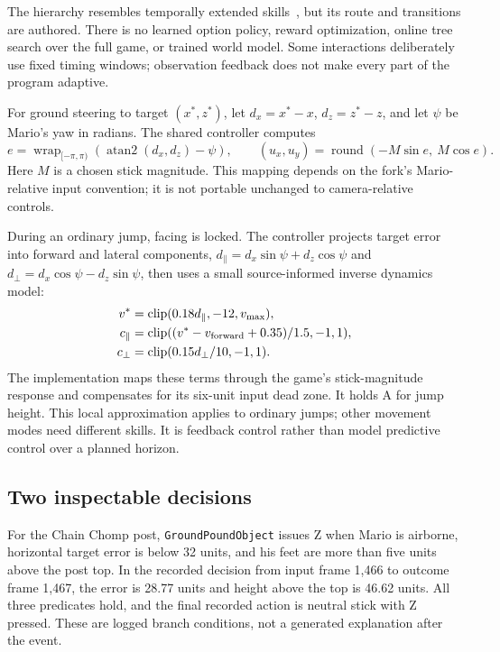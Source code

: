 \documentclass[10pt,letterpaper]{article}
\newcommand{\code}[1]{\texttt{#1}}
\newcommand{\clip}{\operatorname{clip}}
\newcommand{\wrap}{\operatorname{wrap}}
\begin{document}
The hierarchy resembles temporally extended skills~\cite{options}, but its route and transitions are authored. There is no learned option policy, reward optimization, online tree search over the full game, or trained world model. Some interactions deliberately use fixed timing windows; observation feedback does not make every part of the program adaptive.

For ground steering to target $(x^*,z^*)$, let $d_x=x^*-x$, $d_z=z^*-z$, and let $\psi$ be Mario's yaw in radians. The shared controller computes
\begin{equation}
 e=\wrap_{[-\pi,\pi)}(\operatorname{atan2}(d_x,d_z)-\psi),\qquad
 (u_x,u_y)=\operatorname{round}(-M\sin e,\ M\cos e).
\end{equation}
Here $M$ is a chosen stick magnitude. This mapping depends on the fork's Mario-relative input convention; it is not portable unchanged to camera-relative controls.

During an ordinary jump, facing is locked. The controller projects target error into forward and lateral components, $d_\parallel=d_x\sin\psi+d_z\cos\psi$ and $d_\perp=d_x\cos\psi-d_z\sin\psi$, then uses a small source-informed inverse dynamics model:
\begin{align}
 v^*&=\clip(0.18d_\parallel,-12,v_{\max}),\\
 c_\parallel&=\clip((v^*-v_{\rm forward}+0.35)/1.5,-1,1),\\
 c_\perp&=\clip(0.15d_\perp/10,-1,1).
\end{align}
The implementation maps these terms through the game's stick-magnitude response and compensates for its six-unit input dead zone. It holds A for jump height. This local approximation applies to ordinary jumps; other movement modes need different skills. It is feedback control rather than model predictive control over a planned horizon.

\subsection{Two inspectable decisions}
For the Chain Chomp post, \code{GroundPoundObject} issues Z when Mario is airborne, horizontal target error is below 32 units, and his feet are more than five units above the post top. In the recorded decision from input frame 1,466 to outcome frame 1,467, the error is 28.77 units and height above the top is 46.62 units. All three predicates hold, and the final recorded action is neutral stick with Z pressed. These are logged branch conditions, not a generated explanation after the event.
\end{document}

